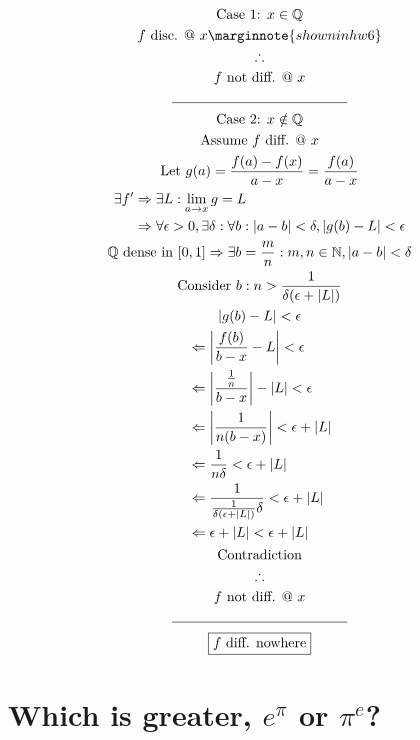 \documentclass[letterpaper]{article}
\DeclarePairedDelimiter\abs{\lvert}{\rvert}
\begin{document}
\begin{gather*}
	\text{Case 1: } x\in\mathbb{Q} \\
	f \text{ disc. @ } x \marginnote{shown in hw6} \\
	\therefore \\
	f \text{ not diff. @ } x \\
	\line(1, 0){125} \\
	\text{Case 2: } x\notin\mathbb{Q} \\
	\text{Assume }f\text{ diff. @ }x \\
	\text{Let }g(a)=\frac{f(a)-f(x)}{a-x}=\frac{f(a)}{a-x} \\
	\begin{aligned}
		\exists f'&\Rightarrow\exists L:\lim_{a\rightarrow x}g=L \\
		&\Rightarrow \forall\epsilon>0, \exists\delta:\forall b:|a-b|<\delta,|g(b)-L|<\epsilon \\
	\end{aligned} \\
	\mathbb{Q}\text{ dense in }[0,1]\Rightarrow\exists b=\frac{m}{n}:m,n\in\mathbb{N},|a-b|<\delta \\
	\text{Consider }b:n>\frac{1}{\delta(\epsilon+|L|)} \\
	|g(b)-L|<\epsilon \\
	\begin{aligned}
		&\Leftarrow\abs[\bigg]{\frac{f(b)}{b-x}-L}<\epsilon \\
		&\Leftarrow\abs[\bigg]{\frac{\frac{1}{n}}{b-x}}-\abs{L}<\epsilon \\
		&\Leftarrow\abs[\bigg]{\frac{1}{n(b-x)}}<\epsilon+\abs{L} \\
		&\Leftarrow\frac{1}{n\delta}<\epsilon+\abs{L} \\
		&\Leftarrow\frac{1}{\frac{1}{\delta(\epsilon+|L|)}\delta}<\epsilon+\abs{L} \\
		&\Leftarrow\epsilon+\abs{L}<\epsilon+\abs{L} \\
	\end{aligned} \\
	\text{Contradiction} \\
	\therefore \\
	f\text{ not diff. @ }x \\
	\line(1, 0){125} \\
	\boxed{f\text{ diff. nowhere}}
\end{gather*}

\section{Which is greater, $e^\pi$ or $\pi^e$?}
\end{document}
